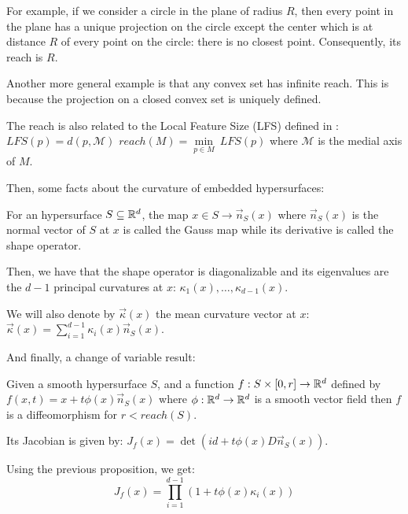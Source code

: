 For example, if we consider a circle in the plane of radius $ R $, then every
point in the plane has a unique projection on the circle except the center which
is at distance $ R $ of every point on the circle: there is no closest point.
Consequently, its reach is $ R $.

Another more general example is that any convex set has infinite reach. This is
because the projection on a closed convex set is uniquely defined.

The reach is also related to the Local Feature Size (LFS) defined in
\cite{amenta1999surface}: $ LFS(p) = d(p, \mathcal{M}) $ $ reach(M) =
\min\limits_{p \in M}~LFS(p) $ where $ \mathcal{M}  $ is the medial axis of $ M
$.


Then, some facts about the curvature of embedded hypersurfaces:

\begin{proposition}
    For an hypersurface $ S \subseteq \mathbb{R}^d $, the map $ x \in S \rightarrow
    \vec{n}_S(x) $ where $ \vec{n}_S(x) $ is the normal vector of $ S $ at $ x $ is
    called the Gauss map while its derivative is called the shape operator.

    Then, we have that the shape operator is diagonalizable and its eigenvalues
    are the $ d-1 $ principal curvatures at $ x $: $ \kappa_1(x), \ldots,
    \kappa_{d-1}(x) $.

    We will also denote by $ \vec{\kappa}(x) $ the mean curvature vector at $ x
    $: $ \vec{\kappa}(x) = \sum_{i=1}^{d-1} \kappa_i(x) \vec{n}_S(x) $.
\end{proposition}

And finally, a change of variable result:

\begin{lemma}
    \label{lemma:diffeo}
    Given a smooth hypersurface $ S $, and a function $ f : S \times [0, r] \to \mathbb{R}^d $
    defined by $ f(x, t) = x + t \phi(x) \vec{n}_S(x) $ where $ \phi : \mathbb{R}^d \to
    \mathbb{R}^d $ is a smooth vector field then $ f $ is a diffeomorphism for $ r < reach(S) $.

    Its Jacobian is given by: $ J_f(x) = \det(id + t \phi(x) D \vec{n}_S (x)) $.

    Using the previous proposition, we get:
    $$ J_f(x) = \prod_{i=1}^{d-1} (1 + t \phi(x) \kappa_i(x)) $$
\end{lemma}

